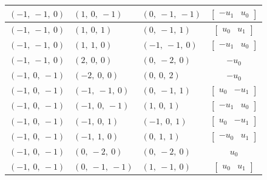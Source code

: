 \documentclass[11pt]{article}
\theoremstyle{definition}
\begin{document}
\begin{longtable}{|l|l|l|c|}
    \hline
    $\left( -1, \  -1, \  0\right)$ & $\left( 1, \  0, \  -1\right)$ & $\left( 0, \  -1, \  -1\right)$ & $\left[\begin{matrix}- u_{1} & u_{0}\end{matrix}\right]$ \\
    \hline
    $\left( -1, \  -1, \  0\right)$ & $\left( 1, \  0, \  1\right)$ & $\left( 0, \  -1, \  1\right)$ & $\left[\begin{matrix}u_{0} & u_{1}\end{matrix}\right]$ \\
    \hline
    $\left( -1, \  -1, \  0\right)$ & $\left( 1, \  1, \  0\right)$ & $\left( -1, \  -1, \  0\right)$ & $\left[\begin{matrix}- u_{1} & u_{0}\end{matrix}\right]$ \\
    \hline
    $\left( -1, \  -1, \  0\right)$ & $\left( 2, \  0, \  0\right)$ & $\left( 0, \  -2, \  0\right)$ & $- u_{0}$ \\
    \hline
    $\left( -1, \  0, \  -1\right)$ & $\left( -2, \  0, \  0\right)$ & $\left( 0, \  0, \  2\right)$ & $- u_{0}$ \\
    \hline
    $\left( -1, \  0, \  -1\right)$ & $\left( -1, \  -1, \  0\right)$ & $\left( 0, \  -1, \  1\right)$ & $\left[\begin{matrix}u_{0} & - u_{1}\end{matrix}\right]$ \\
    \hline
    $\left( -1, \  0, \  -1\right)$ & $\left( -1, \  0, \  -1\right)$ & $\left( 1, \  0, \  1\right)$ & $\left[\begin{matrix}- u_{1} & u_{0}\end{matrix}\right]$ \\
    \hline
    $\left( -1, \  0, \  -1\right)$ & $\left( -1, \  0, \  1\right)$ & $\left( -1, \  0, \  1\right)$ & $\left[\begin{matrix}u_{0} & - u_{1}\end{matrix}\right]$ \\
    \hline
    $\left( -1, \  0, \  -1\right)$ & $\left( -1, \  1, \  0\right)$ & $\left( 0, \  1, \  1\right)$ & $\left[\begin{matrix}- u_{0} & u_{1}\end{matrix}\right]$ \\
    \hline
    $\left( -1, \  0, \  -1\right)$ & $\left( 0, \  -2, \  0\right)$ & $\left( 0, \  -2, \  0\right)$ & $u_{0}$ \\
    \hline
    $\left( -1, \  0, \  -1\right)$ & $\left( 0, \  -1, \  -1\right)$ & $\left( 1, \  -1, \  0\right)$ & $\left[\begin{matrix}u_{0} & u_{1}\end{matrix}\right]$ \\

\end{longtable}
\end{document}
